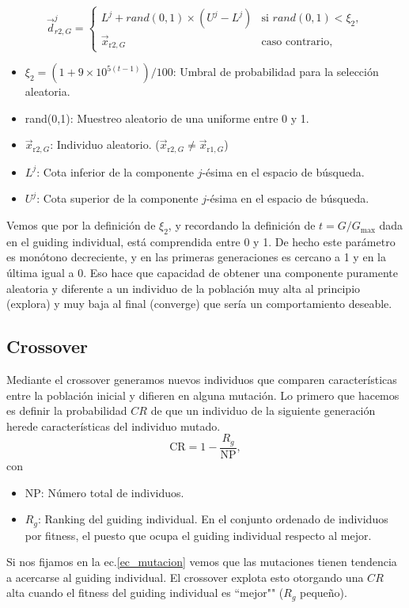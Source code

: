 \documentclass{article}
\begin{document}
\begin{equation}
    \vec{d}^{j}_{r2,G} = \left\{\begin{array}{ll}
            L^{j} + rand(0,1)\times(U^{j}-L^{j})&\text{si }rand(0,1)<\xi_2,\\
            \vec{x}_{\text{r2},G}&\text{caso contrario},
    \end{array}\right.
\label{ec_rand_vec}
\end{equation}
\begin{itemize}
    \item $\xi_{2}=(1+9\times 10^{5(t-1)})/100$: Umbral de probabilidad para la selección aleatoria.
    \item rand(0,1): Muestreo aleatorio de una uniforme entre 0 y 1.
    \item $\vec{x}_{\text{r2},G}$: Individuo aleatorio. ($\vec{x}_{\text{r2},G}\neq\vec{x}_{\text{r1},G}$)
    \item $L^{j}$: Cota inferior de la componente $j$-ésima en el espacio de búsqueda.
    \item $U^{j}$: Cota superior de la componente $j$-ésima en el espacio de búsqueda.
\end{itemize}
Vemos que por la definición de $\xi_{2}$, y recordando la definición de $t=G/G_{\max}$ dada en el guiding individual, está comprendida entre 0 y 1. De hecho este parámetro es monótono decreciente, y en las primeras generaciones es cercano a 1 y en la última igual a 0. Eso hace que capacidad de obtener una componente puramente aleatoria y diferente a un individuo de la población muy alta al principio (explora) y muy baja al final (converge) que sería un comportamiento deseable.

\subsection{Crossover}
Mediante el crossover generamos nuevos individuos que comparen características entre la población inicial y difieren en alguna mutación. Lo primero que hacemos es definir la probabilidad $CR$ de que un individuo de la siguiente generación herede características del individuo mutado.
\begin{equation}
    \text{CR} = 1 - \frac{R_g}{\text{NP}},
    \label{ec_CR}
\end{equation}
con
\begin{itemize}
    \item NP: Número total de individuos.
    \item $R_g$: Ranking del guiding individual. En el conjunto ordenado de individuos por fitness, el puesto que ocupa el guiding individual respecto al mejor.
\end{itemize}
Si nos fijamos en la ec.\eqref{ec_mutacion} vemos que las mutaciones tienen tendencia a acercarse al guiding individual. El crossover explota esto otorgando una $CR$ alta cuando el fitness del guiding individual es ``mejor"" ($R_g$ pequeño).
\end{document}
